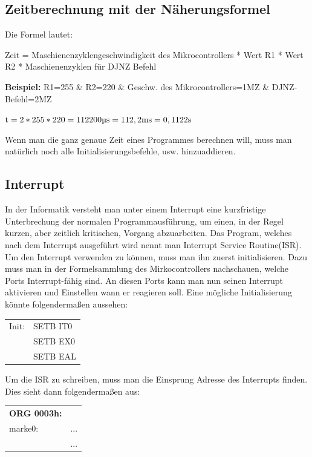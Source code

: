 \documentclass[12pt,a4paper]{article}
\begin{document}
\subsection{Zeitberechnung mit der Näherungsformel}
    Die Formel lautet:
    \begin{center}
        Zeit = Maschienenzyklengeschwindigkeit des Mikrocontrollers * Wert R1 * Wert R2 * Maschienenzyklen für DJNZ Befehl
    \end{center}
    \textbf{Beispiel:}\newline
    R1=255 \& R2=220 \& Geschw. des Mikrocontrollers=1MZ \& DJNZ-Befehl=2MZ\newline
    \begin{center}
        $\text{t} = 2*255*220 = 112200\text{\textmu s} = 112,2\text{ms} = 0,1122\text{s}$    
    \end{center}
    Wenn man die ganz genaue Zeit eines Programmes berechnen will, muss man natürlich noch alle Initialisierungsbefehle, usw. hinzuaddieren.
    
\subsection{Interrupt}
    In der Informatik versteht man unter einem Interrupt eine kurzfristige Unterbrechung der normalen Programmausführung, um einen, in der Regel kurzen, aber zeitlich kritischen, Vorgang abzuarbeiten. Das Program, welches nach dem Interrupt ausgeführt wird nennt man Interrupt Service Routine(ISR).
    Um den Interrupt verwenden zu können, muss man ihn zuerst initialisieren. Dazu muss man in der Formelsammlung des Mirkocontrollers nachschauen, welche Ports Interrupt-fähig sind. An diesen Ports kann man nun seinen Interrupt aktivieren und Einstellen wann er reagieren soll.\newline
    Eine mögliche Initialisierung könnte folgendermaßen aussehen:
    \begin{table}[h]
        \centering
        \begin{tabularx}{5cm}{XX}
            Init: & SETB IT0\\
            &SETB EX0\\
            &SETB EAL\\
        \end{tabularx}
    \end{table}
    \vspace{1cm}
    \newline Um die ISR zu schreiben, muss man die Einsprung Adresse des Interrupts finden.\newline
    Dies sieht dann folgendermaßen aus:
    \begin{table}[h]
        \centering
        \begin{tabularx}{6cm}{XX}
            \textbf{ORG 0003h:} & \\
            marke0: & ...\\
            & ...\\
        \end{tabularx}
    \end{table}
\end{document}
